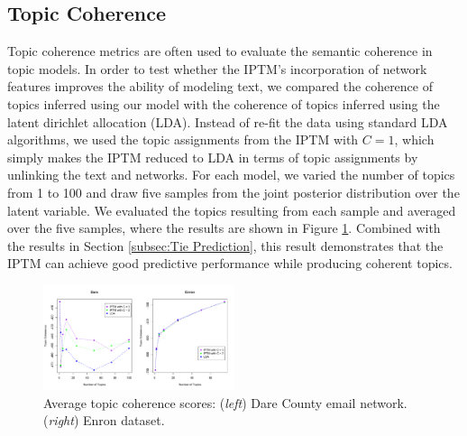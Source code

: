 \documentclass[twoside]{article}
\begin{document}
\subsection{Topic Coherence}\label{subsec:Topic Coherence}
Topic coherence metrics \cite{mimno2011optimizing} are often used to evaluate the semantic coherence in topic models. In order to test whether the IPTM's incorporation of network features improves the ability of modeling text, we compared the coherence of topics inferred using our model with the coherence of topics inferred using the latent dirichlet allocation (LDA). Instead of re-fit the data using standard LDA algorithms, we used the topic assignments from the IPTM with $C=1$, which simply makes the IPTM reduced to LDA in terms of topic assignments by unlinking the text and networks. For each model, we varied the number of topics from 1 to 100 and draw five samples from the joint posterior distribution over the latent variable. We evaluated the topics resulting from each sample and averaged over the five samples, where the results are shown in Figure \ref{fig:topic}. Combined with the results in Section \ref{subsec:Tie Prediction}, this result demonstrates that the IPTM can achieve good predictive performance while producing coherent topics. 
\begin{figure}[h]
	\centering
	\includegraphics[width = 0.5\textwidth]{plots/topic_coherence.pdf}
	\caption{Average topic coherence scores: (\textit{left}) Dare County email network. (\textit{right}) Enron dataset.}
	\label{fig:topic}
	\end{figure}
\end{document}
